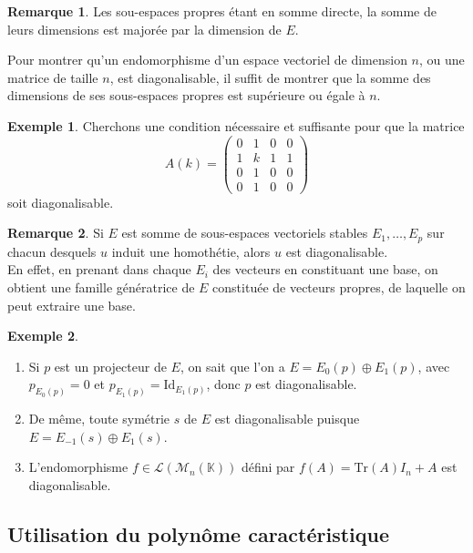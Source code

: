 \documentclass[french]{article}
\newcommand{\K}{\mathbb{K}}
\newcommand{\Tr}{\text{Tr}}
\newcommand{\Id}{\text{Id}}
\theoremstyle{plain}
\theoremstyle{definition}
\newtheorem*{ex}{Exemple}
\newtheorem*{rmq}{Remarque}
\theoremstyle{remark}
\begin{document}
	\begin{rmq}
		Les sou-espaces propres étant en somme directe, la somme de leurs dimensions est majorée par la dimension de $E$.
	\end{rmq}
	
	\begin{met}
		Pour montrer qu'un endomorphisme d'un espace vectoriel de dimension $n$, ou une matrice de taille $n$, est diagonalisable, il suffit de montrer que la somme des dimensions de ses sous-espaces propres est supérieure ou égale à $n$.
	\end{met}
	
	\begin{ex}
		Cherchons une condition nécessaire et suffisante pour que la matrice $$A(k)=\begin{pmatrix}
			0&1&0&0\\
			1&k&1&1\\
			0&1&0&0\\
			0&1&0&0
		\end{pmatrix}$$ soit diagonalisable.
	\end{ex}
	
	\begin{rmq}
		Si $E$ est somme de sous-espaces vectoriels stables $E_1,\ldots,E_p$ sur chacun desquels $u$ induit une homothétie, alors $u$ est diagonalisable.\\
		En effet, en prenant dans chaque $E_i$ des vecteurs en constituant une base, on obtient une famille génératrice de $E$ constituée de vecteurs propres, de laquelle on peut extraire une base.
	\end{rmq}
	
	\begin{ex}
		\begin{enumerate}
			\item Si $p$ est un projecteur de $E$, on sait que l'on a $E=E_0(p)\oplus E_1(p)$, avec $p_{E_0(p)}=0$ et $p_{E_1(p)}=\Id_{E_1(p)}$, donc $p$ est diagonalisable.
			\item De même, toute symétrie $s$ de $E$ est diagonalisable puisque $E=E_{-1}(s)\oplus E_1(s)$.
			\item L'endomorphisme $f\in\mathcal{L}(\mathcal{M}_n(\K))$ défini par $f(A)=\Tr(A)I_n+A$ est diagonalisable.
		\end{enumerate}
	\end{ex}
	
	\subsection{Utilisation du polynôme caractéristique}
	
\end{document}
